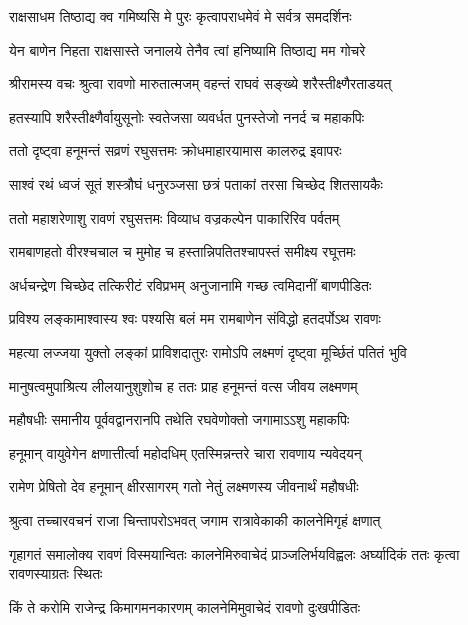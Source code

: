 \twolineshloka
{राक्षसाधम तिष्ठाद्य क्व गमिष्यसि मे पुरः}
{कृत्वापराधमेवं मे सर्वत्र समदर्शिनः} %

\twolineshloka
{येन बाणेन निहता राक्षसास्ते जनालये}
{तेनैव त्वां हनिष्यामि तिष्ठाद्य मम गोचरे} %

\twolineshloka
{श्रीरामस्य वचः श्रुत्वा रावणो मारुतात्मजम्}
{वहन्तं राघवं सङ्ख्ये शरैस्तीक्ष्णैरताडयत्} %

\twolineshloka
{हतस्यापि शरैस्तीक्ष्णैर्वायुसूनोः स्वतेजसा}
{व्यवर्धत पुनस्तेजो ननर्द च महाकपिः} %

\twolineshloka
{ततो दृष्ट्वा हनूमन्तं सव्रणं रघुसत्तमः}
{क्रोधमाहारयामास कालरुद्र इवापरः} %

\twolineshloka
{साश्वं रथं ध्वजं सूतं शस्त्रौघं धनुरञ्जसा}
{छत्रं पताकां तरसा चिच्छेद शितसायकैः} %

\twolineshloka
{ततो महाशरेणाशु रावणं रघुसत्तमः}
{विव्याध वज्रकल्पेन पाकारिरिव पर्वतम्} %

\twolineshloka
{रामबाणहतो वीरश्चचाल च मुमोह च}
{हस्तान्निपतितश्चापस्तं समीक्ष्य रघूत्तमः} %

\twolineshloka
{अर्धचन्द्रेण चिच्छेद तत्किरीटं रविप्रभम्}
{अनुजानामि गच्छ त्वमिदानीं बाणपीडितः} %

\twolineshloka
{प्रविश्य लङ्कामाश्वास्य श्वः पश्यसि बलं मम}
{रामबाणेन संविद्धो हतदर्पोऽथ रावणः} %

\twolineshloka
{महत्या लज्जया युक्तो लङ्कां प्राविशदातुरः}
{रामोऽपि लक्ष्मणं दृष्ट्वा मूर्च्छितं पतितं भुवि} %

\twolineshloka
{मानुषत्वमुपाश्रित्य लीलयानुशुशोच ह}
{ततः प्राह हनूमन्तं वत्स जीवय लक्ष्मणम्} %

\twolineshloka
{महौषधीः समानीय पूर्ववद्वानरानपि}
{तथेति रघवेणोक्तो जगामाऽऽशु महाकपिः} %

\twolineshloka
{हनूमान् वायुवेगेन क्षणात्तीर्त्वा महोदधिम्}
{एतस्मिन्नन्तरे चारा रावणाय न्यवेदयन्} %

\twolineshloka
{रामेण प्रेषितो देव हनूमान् क्षीरसागरम्}
{गतो नेतुं लक्ष्मणस्य जीवनार्थं महौषधीः} %

\twolineshloka
{श्रुत्वा तच्चारवचनं राजा चिन्तापरोऽभवत्}
{जगाम रात्रावेकाकी कालनेमिगृहं क्षणात्} %

\threelineshloka
{गृहागतं समालोक्य रावणं विस्मयान्वितः}
{कालनेमिरुवाचेदं प्राञ्जलिर्भयविह्वलः}
{अर्घ्यादिकं ततः कृत्वा रावणस्याग्रतः स्थितः} %

\twolineshloka
{किं ते करोमि राजेन्द्र किमागमनकारणम्}
{कालनेमिमुवाचेदं रावणो दुःखपीडितः} %

